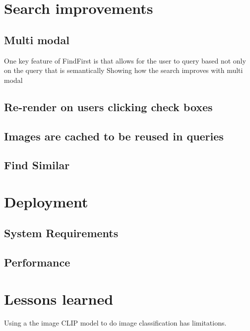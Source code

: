 \documentclass[letterpaper, 10 pt, conference]{ieeeconf}  %
\begin{document}
\section{Search improvements}
\subsection{Multi modal}
One key feature of FindFirst is that allows for the user to query based not only on the 
query that is semantically 
Showing how the search improves with multi modal 
\subsection{Re-render on users clicking check boxes}
\subsection{Images are cached to be reused in queries}

\subsection{Find Similar}

\section{Deployment}

\subsection{System Requirements}

\subsection{Performance}


\section{Lessons learned} 
Using a the image CLIP model to do image classification has limitations. 
\end{document}
